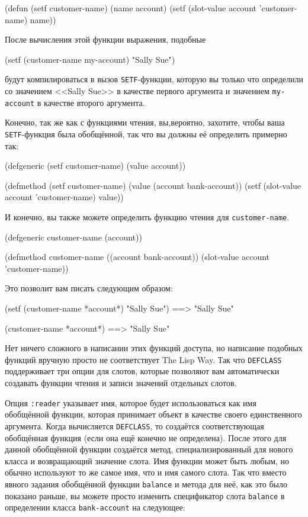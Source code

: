 \begin{myverb}
(defun (setf customer-name) (name account)
  (setf (slot-value account 'customer-name) name))
\end{myverb}

После вычисления этой функции выражения, подобные

\begin{myverb}
(setf (customer-name my-account) "Sally Sue")
\end{myverb}

\noindent{}будут компилироваться в вызов \lstinline{SETF}-функции, которую вы только что определили со
значением <<Sally Sue>> в качестве первого аргумента и значением \lstinline{my-account} в
качестве второго аргумента.

Конечно, так же как с функциями чтения, вы,вероятно, захотите, чтобы ваша
\lstinline{SETF}-функция была обобщённой, так что вы должны её определить примерно так:

\begin{myverb}
(defgeneric (setf customer-name) (value account))

(defmethod (setf customer-name) (value (account bank-account))
  (setf (slot-value account 'customer-name) value))
\end{myverb}

И конечно, вы также можете определить функцию чтения для \lstinline{customer-name}.

\begin{myverb}
(defgeneric customer-name (account))

(defmethod customer-name ((account bank-account))
  (slot-value account 'customer-name))
\end{myverb}

Это позволит вам писать следующим образом:

\begin{myverb}
  (setf (customer-name *account*) "Sally Sue") ==> "Sally Sue"

  (customer-name *account*)                    ==> "Sally Sue"
\end{myverb}

Нет ничего сложного в написании этих функций доступа, но написание подобных функций вручную
просто не соответствует The Lisp Way.  Так что \lstinline{DEFCLASS} поддерживает три опции для
слотов, которые позволяют вам автоматически создавать функции чтения и записи значений
отдельных слотов.

Опция \lstinline{:reader} указывает имя, которое будет использоваться как имя обобщённой
функции, которая принимает объект в качестве своего единственного аргумента.  Когда
вычисляется \lstinline{DEFCLASS}, то создаётся соответствующая обобщённая функция (если
она ещё конечно не определена).  После этого для данной обобщённой функции создаётся
метод, специализированный для нового класса и возвращающий значение слота.  Имя функции
может быть любым, но обычно используют то же самое имя, что и имя самого слота.  Так что
вместо явного задания обобщённой функции \lstinline{balance} и метода для неё, как это
было показано раньше, вы можете просто изменить спецификатор слота \lstinline{balance} в
определении класса \lstinline{bank-account} на следующее:

